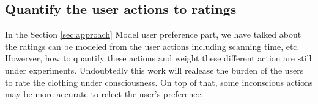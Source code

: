 \subsection{Quantify the user actions to ratings}
In the Section \ref{sec:approach} Model user preference part, we have talked about the ratings can be modeled from the user actions including scanning time, etc. Howerver, how to quantify these actions and weight these different action are still under experiments. Undoubtedly this work will realease the burden of the users to rate the clothing under consciousness. On top of that, some inconscious actions may be more accurate to relect the user's preference.

